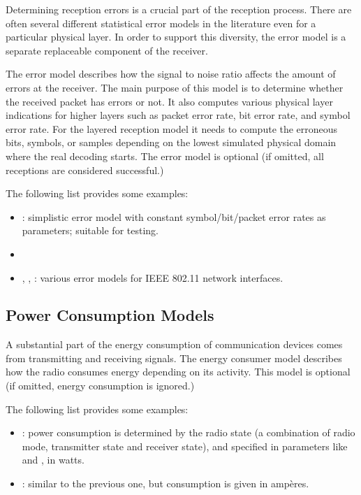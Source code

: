 Determining reception errors is a crucial part of the reception process.
There are often several different statistical error models in the literature
even for a particular physical layer. In order to support this diversity, the
error model is a separate replaceable component of the receiver.

The error model describes how the signal to noise ratio affects the amount of
errors at the receiver. The main purpose of this model is to determine whether
the received packet has errors or not. It also computes various physical
layer indications for higher layers such as packet error rate, bit error rate,
and symbol error rate. For the layered reception model it needs to compute the
erroneous bits, symbols, or samples depending on the lowest simulated physical
domain where the real decoding starts. The error model is optional (if omitted,
all receptions are considered successful.)

The following list provides some examples:

\begin{itemize}
  \item {}: simplistic error model with constant
    symbol/bit/packet error rates as parameters; suitable for testing.
  \item {}
  \item {}, ,
    : various error models for IEEE 802.11
    network interfaces.
\end{itemize}

\subsection{Power Consumption Models}
\label{sec:phy:power-consumption-models}

A substantial part of the energy consumption of communication devices comes from
transmitting and receiving signals. The energy consumer model describes how the
radio consumes energy depending on its activity. This model is optional (if
omitted, energy consumption is ignored.)

The following list provides some examples:

\begin{itemize}
  \item {}: power consumption is
    determined by the radio state (a combination of radio mode,
    transmitter state and receiver state), and specified in
    parameters like  and
    , in watts.
  \item {}: similar to the previous
    one, but consumption is given in amp\`eres.
\end{itemize}

